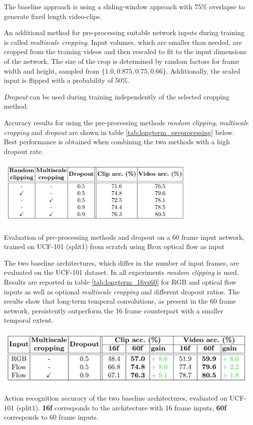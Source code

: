 The baseline approach is using a sliding-window approach with $75\%$ overlapse to generate fixed length video-clips.

An additional method for pre-processing suitable network inputs during training is called \textit{multiscale cropping}.
Input volumes, which are smaller than needed, are cropped from the training videos and then rescaled to fit to the input dimensions of the network.
The size of the crop is determined by random factors for frame width and height, sampled from $\{1.0, 0.875, 0.75, 0.66\}$.
Additionally, the scaled input is flipped with a probability of 50\%.

\textit{Dropout} \cite{srivastava_dropout:_2014} can be used during training independently of the selected cropping method.

Accuracy results for using the pre-processing methods \textit{random clipping}, \textit{multiscale cropping} and \textit{dropout} are shown in table \ref{tab:longterm_preprocessing} below.
Best performance is obtained when combining the two methods with a high dropout rate.
\begin{table}[H]
    \centering
    \includegraphics[width=0.75\textwidth]{img_deep/longterm_preprocessing}
    \caption{Evaluation of pre-processing methods and dropout on a 60 frame input network, trained on UCF-101 (split1) from scratch using Brox optical flow as input \cite{varol_long-term_2016}}
    \label{tab:longterm_preprocessing}
\end{table}

The two baseline architectures, which differ in the number of input frames, are evaluated on the UCF-101 dataset.
In all experiments \textit{random clipping} is used.
Results are reported in table \ref{tab:longterm_16vs60} for RGB and optical flow inputs as well as optional \textit{multiscale cropping} and different dropout ratios.
The results show that long-term temporal convolutions, as present in the 60 frame network, persistently outperform the 16 frame counterpart with a smaller temporal extent.

\begin{table}[H]
    \centering
    \includegraphics[width=\textwidth]{img_deep/longterm_16vs60}
    \caption{Action recognition accuracy of the two baseline architectures, evaluated on UCF-101 (split1). \textbf{16f} corresponds to the architecture with 16 frame inputs, \textbf{60f} corresponds to 60 frame inputs. \cite{varol_long-term_2016}}
    \label{tab:longterm_16vs60}
\end{table}


